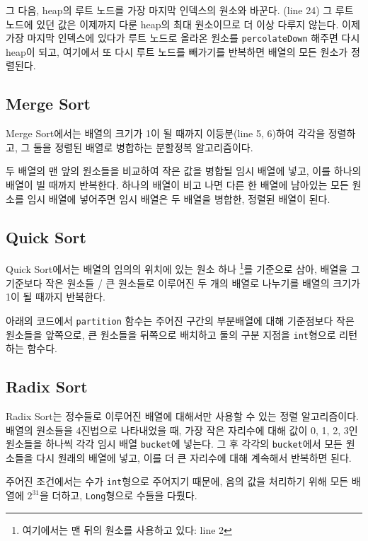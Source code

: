 \documentclass{article}
\begin{document}
	그 다음, heap의 루트 노드를 가장 마지막 인덱스의 원소와 바꾼다. (line 24)
	그 루트 노드에 있던 값은 이제까지 다룬 heap의 최대 원소이므로 더 이상
	다루지 않는다.
	이제 가장 마지막 인덱스에 있다가 루트 노드로 올라온 원소를 \texttt{percolateDown}
	해주면 다시 heap이 되고, 여기에서 또 다시 루트 노드를 빼가기를 반복하면
	배열의 모든 원소가 정렬된다.

	
	\subsection{Merge Sort}
	Merge Sort에서는 배열의 크기가 1이 될 때까지 이등분(line 5, 6)하여 각각을 정렬하고,
	그 둘을 정렬된 배열로 병합하는 분할정복 알고리즘이다.
	
	두 배열의 맨 앞의 원소들을 비교하여 작은 값을 병합될 임시 배열에 넣고,
	이를 하나의 배열이 빌 때까지 반복한다.
	하나의 배열이 비고 나면 다른 한 배열에 남아있는 모든 원소를 임시 배열에 넣어주면
	임시 배열은 두 배열을 병합한, 정렬된 배열이 된다.
	
	
	\subsection{Quick Sort}
	Quick Sort에서는 배열의 임의의 위치에 있는 원소 하나%
	\footnote{여기에서는 맨 뒤의 원소를 사용하고 있다: line 2}를 기준으로 삼아,
	배열을 그 기준보다 작은 원소들 / 큰 원소들로 이루어진 두 개의 배열로 나누기를
	배열의 크기가 1이 될 때까지 반복한다.
	
	아래의 코드에서 \texttt{partition} 함수는 주어진 구간의 부분배열에 대해
	기준점보다 작은 원소들을 앞쪽으로, 큰 원소들을 뒤쪽으로 배치하고
	둘의 구분 지점을 \texttt{int}형으로 리턴하는 함수다.
	
	
	
	\subsection{Radix Sort}
	Radix Sort는 정수들로 이루어진 배열에 대해서만 사용할 수 있는 정렬 알고리즘이다.
	배열의 원소들을 4진법으로 나타내었을 때, 가장 작은 자리수에 대해 값이 0, 1, 2, 3인
	원소들을 하나씩 각각 임시 배열 \texttt{bucket}에 넣는다. 그 후 각각의 \texttt{bucket}에서
	모든 원소들을 다시 원래의 배열에 넣고, 이를 더 큰 자리수에 대해 계속해서 반복하면 된다.
	
	주어진 조건에서는 수가 \texttt{int}형으로 주어지기 때문에, 음의 값을 처리하기 위해
	모든 배열에 $ 2^{31} $을 더하고, \texttt{Long}형으로 수들을 다뤘다.
	
\end{document}
